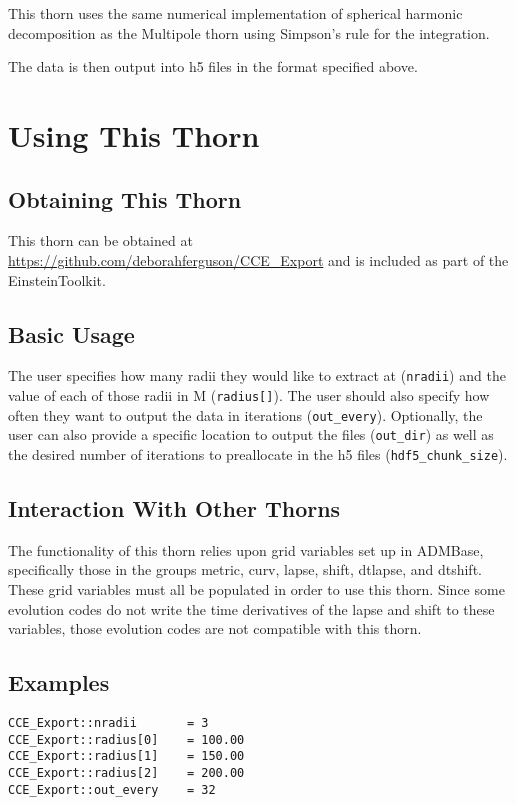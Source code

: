 \documentclass{article}
\begin{document}
This thorn uses the same numerical implementation of spherical harmonic decomposition as the Multipole thorn using 
Simpson’s rule for the integration.

The data is then output into h5 files in the format specified above.

\section{Using This Thorn}

\subsection{Obtaining This Thorn}

This thorn can be obtained at \url{https://github.com/deborahferguson/CCE_Export} and is included as part of the EinsteinToolkit.

\subsection{Basic Usage}

The user specifies how many radii they would like to extract at (\texttt{nradii}) and the value of each of those radii 
in M (\texttt{radius[]}). The user should also specify how often they want to output the data in iterations (\texttt{out\_every}).
Optionally, the user can also provide a specific location to output the files (\texttt{out\_dir}) as well as the desired 
number of iterations to preallocate in the h5 files (\texttt{hdf5\_chunk\_size}).

\subsection{Interaction With Other Thorns}

The functionality of this thorn relies upon grid variables set up in ADMBase, specifically those in the groups metric, curv, 
lapse, shift, dtlapse, and dtshift. These grid variables must all be populated in order to use this thorn. Since some 
evolution codes do not write the time derivatives of the lapse and shift to these variables, those evolution codes are not 
compatible with this thorn.

\subsection{Examples}

\begin{verbatim}
CCE_Export::nradii       = 3
CCE_Export::radius[0]    = 100.00
CCE_Export::radius[1]    = 150.00
CCE_Export::radius[2]    = 200.00
CCE_Export::out_every    = 32
\end{verbatim}
\end{document}
